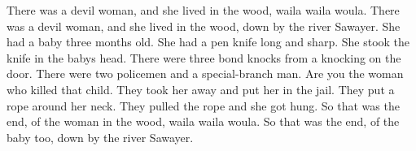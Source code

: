 \beginverse*
There was a devil woman, 
and she lived in the wood,
waila waila woula.
There was a devil woman,
and she lived in the wood,
down by the river Sawayer.
\endverse
\beginverse*
She had a baby three months old.
\endverse
\beginverse*
She had a pen knife long and sharp.
\endverse
\beginverse*
She stook the knife in the babys head.
\endverse
\beginverse*
There were three bond knocks from a knocking on the door.
\endverse
\beginverse*
There were two policemen and a special-branch man.
\endverse
\beginverse*
Are you the woman who killed that child.
\endverse
\beginverse*
They took her away and put her in the jail.
\endverse
\beginverse*
They put a rope around her neck.
\endverse
\beginverse*
They pulled the rope and she got hung.
\endverse
\beginverse*
So that was the end,
of the woman in the wood,
waila waila woula.
So that was the end,
of the baby too,
down by the river Sawayer.
\endverse
\endsong